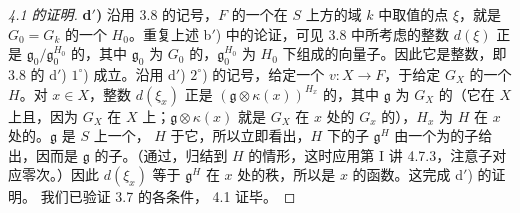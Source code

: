 \begin{proof}[ 4.1 的证明]
\textbf{d$'$)} 沿用 3.8 的记号，$F$ 的一个在 $S$ 上方的域 $k$ 中取值的点 $\xi$，就是 $G_0=G_k$ 的一个 $H_0$。重复上述 b$'$) 中的论证，可见 3.8 中所考虑的整数 $d(\xi)$ 正是 $\mathfrak g_0/\mathfrak g_0^{H_0}$ 的，其中 $\mathfrak g_0$ 为 $G_0$ 的，$\mathfrak g_0^{H_0}$ 为 $H_0$ 下组成的向量子。因此它是整数，即 3.8 的 d$'$) $1^\circ$) 成立。沿用 d$'$) $2^\circ$) 的记号，给定一个 $v:X\to F$，于给定 $G_X$ 的一个 $H$。对 $x\in X$，整数 $d(\xi_x)$ 正是 $(\mathfrak g\otimes\kappa(x))^{H_x}$ 的，其中 $\mathfrak g$ 为 $G_X$ 的（它在 $X$ 上且，因为 $G_X$ 在 $X$ 上；$\mathfrak g\otimes\kappa(x)$ 就是 $G_X$ 在 $x$ 处的 $G_x$ 的），$H_x$ 为 $H$ 在 $x$ 处的。$\mathfrak g$ 是 $S$ 上一个， $H$ 于它，所以立即看出，$H$ 下的子 $\mathfrak g^H$ 由一个为的子给出，因而是 $\mathfrak g$ 的子。（通过，归结到 $H$ 的情形，这时应用第 I 讲 4.7.3，注意子对应零次。）因此 $d(\xi_x)$ 等于 $\mathfrak g^H$ 在 $x$ 处的秩，所以是 $x$ 的函数。这完成 d$'$) 的证明。
我们已验证 3.7 的各条件， 4.1 证毕。
\end{proof}
